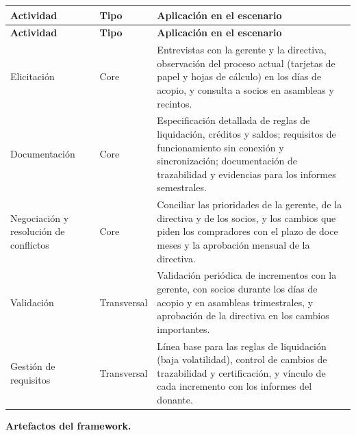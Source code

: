 \documentclass[12pt,a4paper]{article}
\begin{document}
{\small
\setlength{\tabcolsep}{4pt}
\renewcommand{\arraystretch}{1.3}
\begin{longtable}{
|>{\raggedright\arraybackslash}p{}
|>{\raggedright\arraybackslash}p{}
|>{\raggedright\arraybackslash}p{}|}
\hline
\textbf{Actividad} & \textbf{Tipo} & \textbf{Aplicación en el escenario} \\
\hline
\endfirsthead
\hline
\textbf{Actividad} & \textbf{Tipo} & \textbf{Aplicación en el escenario} \\
\hline
\endhead
Elicitación & Core & Entrevistas con la gerente y la directiva, observación del proceso actual (tarjetas de papel y hojas de cálculo) en los días de acopio, y consulta a socios en asambleas y recintos. \\
\hline
Documentación & Core & Especificación detallada de reglas de liquidación, créditos y saldos; requisitos de funcionamiento sin conexión y sincronización; documentación de trazabilidad y evidencias para los informes semestrales. \\
\hline
Negociación y resolución de conflictos & Core & Conciliar las prioridades de la gerente, de la directiva y de los socios, y los cambios que piden los compradores con el plazo de doce meses y la aprobación mensual de la directiva. \\
\hline
Validación & Transversal & Validación periódica de incrementos con la gerente, con socios durante los días de acopio y en asambleas trimestrales, y aprobación de la directiva en los cambios importantes. \\
\hline
Gestión de requisitos & Transversal & Línea base para las reglas de liquidación (baja volatilidad), control de cambios de trazabilidad y certificación, y vínculo de cada incremento con los informes del donante. \\
\hline
\end{longtable}
}

\textbf{Artefactos del framework.}
\end{document}
